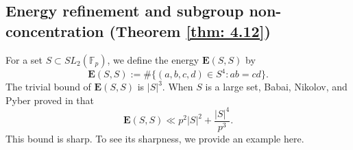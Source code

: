 \documentclass[11pt]{article}
\def\thang#1{\noindent
\textcolor{blue}
{\textsc{(Thang:}
\textsf{#1})}}
\def\thang#1{\noindent
\textcolor{blue}
{\textsc{(Thang:}
\textsf{#1})}}
\def\Ebf{\textbf{E}}
\def\l({\left(}
\def\r){\right)}
\begin{document}
\subsection{Energy refinement and subgroup non-concentration (Theorem \ref{thm: 4.12})}\label{sectionenergy}


For a set $S\subset SL_2(\mathbb{F}_p)$, we define the energy $\Ebf(S, S)$ by
\[\Ebf(S, S):=\#\{(a, b, c, d)\in S^4\colon ab=cd\}.\]
The trivial bound of $\Ebf(S, S)$ is $|S|^3$. When $S$ is a large set, Babai, Nikolov, and Pyber proved in \cite{B.N.P.08} that
 \begin{equation}\label{eq-energy1} \Ebf \l( S, S \r) \ll p^2 |S|^2 + \frac{|S|^4}{p^3} .\end{equation}
This bound is sharp. To see its sharpness, we provide an example here.
\end{document}
